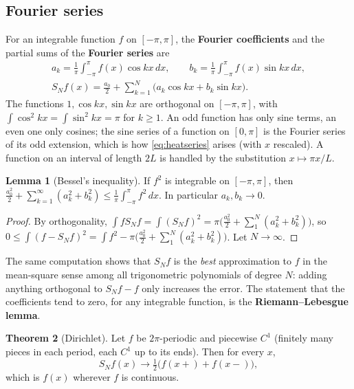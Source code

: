 \documentclass[11pt,a4paper]{article}
\numberwithin{equation}{section}
\theoremstyle{definition}
\newtheorem{thm}{Theorem}[subsection]
\newtheorem{lem}[thm]{Lemma}
\begin{document}
\subsection{Fourier series}
\label{ssec:fourierseries}

For an integrable function $f$ on $[-\pi, \pi]$, the \textbf{Fourier coefficients} and the partial sums of the \textbf{Fourier series} are
\begin{gather*}
a_k = \frac1\pi\int_{-\pi}^\pi f(x)\cos kx\,dx, \qquad b_k = \frac1\pi\int_{-\pi}^\pi f(x)\sin kx\,dx, \\
S_Nf(x) = \frac{a_0}2 + \sum_{k = 1}^N\bigl(a_k\cos kx + b_k\sin kx\bigr) .
\end{gather*}
The functions $1, \cos kx, \sin kx$ are orthogonal on $[-\pi, \pi]$, with $\int\cos^2kx = \int\sin^2kx = \pi$ for $k \geq 1$. An odd function has only sine terms, an even one only cosines; the sine series of a function on $[0, \pi]$ is the Fourier series of its odd extension, which is how \eqref{eq:heatseries} arises (with $x$ rescaled). A
function on an interval of length $2L$ is handled by the substitution $x \mapsto \pi x/L$.

\begin{lem}[Bessel's inequality]
\label{lem:bessel}
If $f^2$ is integrable on $[-\pi, \pi]$, then $\frac{a_0^2}2 + \sum_{k = 1}^\infty(a_k^2 + b_k^2) \leq \frac1\pi\int_{-\pi}^\pi f^2\,dx$. In particular $a_k, b_k \to 0$.
\end{lem}

\begin{proof}
By orthogonality, $\int fS_Nf = \int(S_Nf)^2 = \pi\bigl(\frac{a_0^2}2 + \sum_1^N(a_k^2 + b_k^2)\bigr)$, so $0 \leq \int(f - S_Nf)^2 = \int f^2 - \pi\bigl(\frac{a_0^2}2 + \sum_1^N(a_k^2 + b_k^2)\bigr)$. Let $N \to \infty$.
\end{proof}

The same computation shows that $S_Nf$ is the \emph{best} approximation to $f$ in the mean-square sense among all trigonometric polynomials of degree $N$: adding anything orthogonal to $S_Nf - f$ only increases the error. The statement that the coefficients tend to zero, for any integrable function, is the \textbf{Riemann--Lebesgue
lemma}.

\begin{thm}[Dirichlet]
\label{thm:dirichlet}
Let $f$ be $2\pi$-periodic and piecewise $C^1$ (finitely many pieces in each period, each $C^1$ up to its ends). Then for every $x$,
\[
S_Nf(x) \to \tfrac12\bigl(f(x+) + f(x-)\bigr) ,
\]
which is $f(x)$ wherever $f$ is continuous.
\end{thm}
\end{document}
